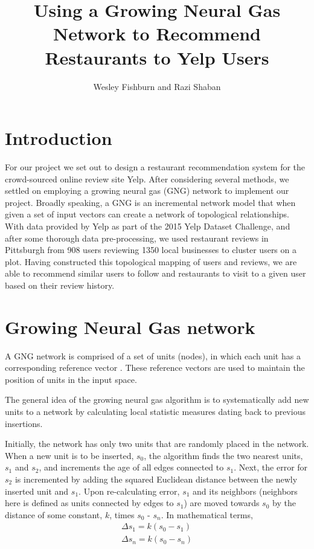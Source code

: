 \documentclass[12pt,letterpaper]{article}
\title{Using a Growing Neural Gas Network to Recommend Restaurants to Yelp Users}
\author{Wesley Fishburn and Razi Shaban}
\begin{document}
\maketitle

\section{Introduction}

For our project we set out to design a restaurant recommendation system for the crowd-sourced online review site Yelp. After considering several methods, we settled on employing a growing neural gas (GNG) network to implement our project. Broadly speaking, a GNG is an incremental network model that when given a set of input vectors can create a network of topological relationships. With data provided by Yelp as part of the 2015 Yelp Dataset Challenge, and after some thorough data pre-processing, we used restaurant reviews in Pittsburgh from 908 users reviewing 1350 local businesses to cluster users on a plot. Having constructed this topological mapping of users and reviews, we are able to recommend similar users to follow and restaurants to visit to a given user based on their review history. 

\section{Growing Neural Gas network}

A GNG network is comprised of a set of units (nodes), in which each unit has a corresponding reference vector \citep{fritzke}. These reference vectors are used to maintain the position of units in the input space.

The general idea of the growing neural gas algorithm is to systematically add new units to a network by calculating local statistic measures dating back to previous insertions. 

Initially, the network has only two units that are randomly placed in the network. When a new unit is to be inserted, $s_0$, the algorithm finds the two nearest units, $s_1$ and $s_2$, and increments the age of all edges connected to $s_1$. Next, the error for $s_2$ is incremented by adding the squared Euclidean distance between the newly inserted unit and $s_1$. Upon re-calculating error, $s_1$ and its neighbors (neighbors here is defined as units connected by edges to $s_1$) are moved towards $s_0$ by the distance of some constant, $k$, times $s_0$ - $s_n$. In mathematical terms, 
\begin{align*}
\Delta s_1 = k(s_0 - s_1)  \\
\Delta s_n = k(s_0 - s_n)
\end{align*}
\end{document}
